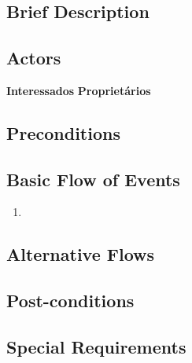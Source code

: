 \section{}

\subsection*{Brief Description}


\subsection*{Actors}

\textbf{Interessados}
\textbf{Proprietários}

\subsection*{Preconditions}
 

\subsection*{Basic Flow of Events}

\begin{enumerate}
    \item 
\end{enumerate}

\subsection*{Alternative Flows}

\textbf{}


\textbf{}


\subsection*{Post-conditions}

\textbf{}


\textbf{}


\subsection*{Special Requirements} 
